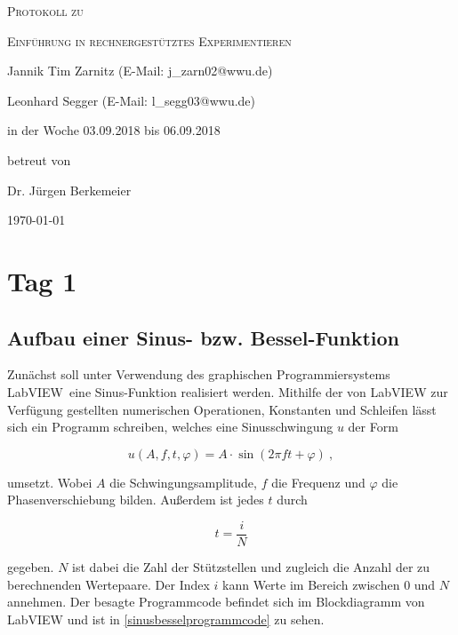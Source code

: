 \documentclass[
a4paper,
12pt,
pagesize,
ngerman
]{scrartcl}
\begin{document}
	
	\begin{titlepage}
		\centering
		{\scshape\LARGE Protokoll zu \par}
		\vspace{1cm}
		{\scshape\huge Einführung in rechnergestütztes Experimentieren \par}
		\vspace{3cm}
		
		{\large Jannik Tim Zarnitz (E-Mail: j\_zarn02@wwu.de) \par}
		{\large Leonhard Segger (E-Mail: l\_segg03@wwu.de) \par}
		\vfill
		
		in der Woche 03.09.2018 bis 06.09.2018\par
		betreut von\par
		{\large Dr. Jürgen Berkemeier}
		
		\vfill
		
		{\large \today\par}
	\end{titlepage}
	\tableofcontents
	\newpage

	\section{Tag 1}
	
	\subsection{Aufbau einer Sinus- bzw. Bessel-Funktion} \label{sinusfkt}
	
	Zunächst soll unter Verwendung des graphischen Programmiersystems \glqq LabVIEW\grqq\ eine Sinus-Funktion realisiert werden. Mithilfe der von LabVIEW zur Verfügung gestellten numerischen Operationen, Konstanten und Schleifen lässt sich ein Programm schreiben, welches eine Sinusschwingung $u$ der Form
	
	\begin{equation} \label{u}
	u(A,f,t,\varphi) = A \cdot \sin(2\pi f t + \varphi) \ ,
	\end{equation}
	
	\noindent umsetzt. Wobei $A$ die Schwingungsamplitude, $f$ die Frequenz und $\varphi$ die Phasenverschiebung bilden. Außerdem ist jedes $t$ durch 
	
	\begin{equation} \label{t}
	t = \frac{i}{N}
	\end{equation}
	
	\noindent gegeben. $N$ ist dabei die Zahl der Stützstellen und zugleich die Anzahl der zu berechnenden Wertepaare. Der Index $i$ kann Werte im Bereich zwischen $0$ und $N$ annehmen. Der besagte Programmcode befindet sich im Blockdiagramm von LabVIEW und ist in \cref{sinusbesselprogrammcode} zu sehen. 
	
\end{document}
